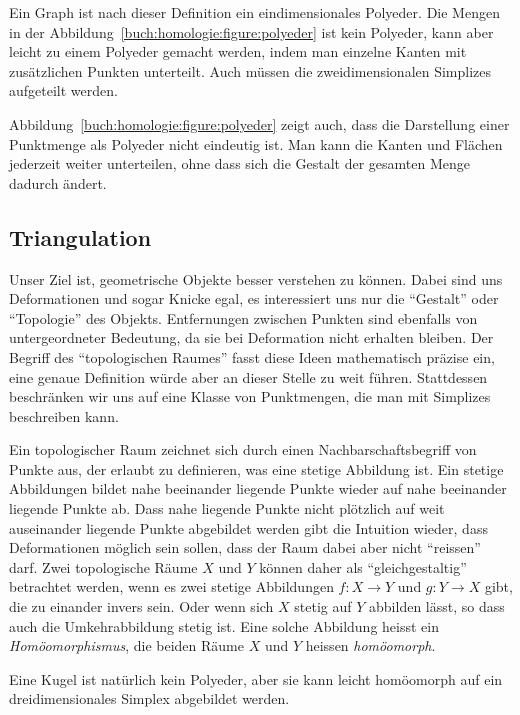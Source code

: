 Ein Graph ist nach dieser Definition ein eindimensionales Polyeder.
Die Mengen in der Abbildung~\ref{buch:homologie:figure:polyeder}
ist kein Polyeder, kann aber leicht zu einem Polyeder gemacht werden,
indem man einzelne Kanten mit zusätzlichen Punkten unterteilt.
Auch müssen die zweidimensionalen Simplizes aufgeteilt werden.

Abbildung~\ref{buch:homologie:figure:polyeder} zeigt auch, dass
die Darstellung einer Punktmenge als Polyeder nicht eindeutig ist.
Man kann die Kanten und Flächen jederzeit weiter unterteilen, ohne
dass sich die Gestalt der gesamten Menge dadurch ändert.

\subsection{Triangulation
\label{buch:subsection:triangulation}}
Unser Ziel ist, geometrische Objekte besser verstehen zu können.
Dabei sind uns Deformationen und sogar Knicke egal, es interessiert uns
nur die ``Gestalt'' oder ``Topologie'' des Objekts.
Entfernungen zwischen Punkten sind ebenfalls von untergeordneter 
Bedeutung, da sie bei Deformation nicht erhalten bleiben.
Der Begriff des ``topologischen Raumes'' fasst diese Ideen mathematisch
präzise ein, eine genaue Definition würde aber an dieser Stelle zu weit
führen.
Stattdessen beschränken wir uns auf eine Klasse von Punktmengen, die man
mit Simplizes beschreiben kann.

Ein topologischer Raum zeichnet sich durch einen Nachbarschaftsbegriff
von Punkte aus, der erlaubt zu definieren, was eine stetige Abbildung ist.
Ein stetige Abbildungen bildet nahe beeinander liegende Punkte wieder
auf nahe beeinander liegende Punkte ab.
Dass nahe liegende Punkte nicht plötzlich auf weit auseinander liegende
Punkte abgebildet werden gibt die Intuition wieder, dass Deformationen
möglich sein sollen, dass der Raum dabei aber nicht ``reissen'' darf.
Zwei topologische Räume $X$ und $Y$ können daher als ``gleichgestaltig''
betrachtet werden, wenn es zwei stetige Abbildungen $f\colon X\to Y$
und $g\colon Y\to X$ gibt, die zu einander invers sein.
Oder wenn sich $X$ stetig auf $Y$ abbilden lässt, so dass auch die
Umkehrabbildung stetig ist.
Eine solche Abbildung heisst ein {\em Homöomorphismus}, die beiden Räume
$X$ und $Y$ heissen {\em homöomorph}.

Eine Kugel ist natürlich kein Polyeder, aber sie kann leicht homöomorph
auf ein dreidimensionales Simplex abgebildet werden.

